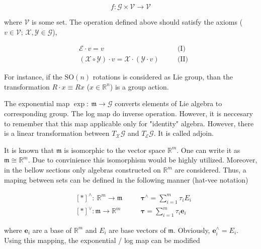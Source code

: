 \begin{equation}
    f: \mathcal{G} \times \mathcal{V} \to \mathcal{V}
\end{equation}

where $\mathcal{V}$ is some set. The operation defined above should satisfy 
the axioms ($v \in \mathcal{V}$; $\mathcal{X}, \mathcal{Y} \in \mathcal{G}$),

\begin{equation}
    \begin{aligned}
        \label{eqn:act_axi}
        & \mathcal{E} \cdot v = v \quad && \text{(I)} \\
        & (\mathcal{X} \circ \mathcal{Y}) \cdot v = 
        \mathcal{X} \cdot (\mathcal{Y} \cdot v) \quad && \text{(II)}
    \end{aligned}
\end{equation}

For instance, if the $\text{SO}(n)$ rotations is considered as Lie group, than the 
transformation $R \cdot x \equiv R x$ ($x \in \mathbb{R}^n$) is a group action.

The exponential map $\exp:\ \mathfrak{m} \to \mathcal{G}$ converts elements of 
Lie algebra to corresponding group. The log map do inverse operation. 
However, it is neccesary to remember that 
this map applicable only for "identity" algebra. However, there is a linear
transformation between $T_{\mathcal{X}} \mathcal{G}$ and $T_{\mathcal{E}} 
\mathcal{G}$. It is called adjoin.

It is known that $\mathfrak{m}$ is isomorphic to the vector space $\mathbb{R}^m$. 
One can write it as $\mathfrak{m} \cong \mathbb{R}^m$. Due to convinience this 
isomorphism would be highly utilized. Moreover, in the bellow sections only 
algebras constructed on $\mathbb{R}^m$ are considered. Thus, a maping between 
sets can be defined in the following manner (hat-vee notation)

\begin{equation}
    \begin{aligned}
        \label{eqn:hat_vee_not}
        & [*]^\wedge: \ \mathbb{R}^m \to \mathfrak{m} \quad &&
        \boldsymbol{\tau}^\wedge = \sum_{i=1}^{m} \tau_i E_i \\
        & [*]^\vee: \mathfrak{m} \to \mathbb{R}^m \quad && 
        \boldsymbol{\tau} = \sum_{i=1}^{m} \tau_i \mathbf{e}_i
    \end{aligned}
\end{equation}

where $\mathbf{e}_i$ are a base of $\mathbb{R}^m$ and $E_i$ are base vectors 
of $\mathfrak{m}$. Obviously, $\mathbf{e}_i^\wedge = E_i$. Using this mapping, the
exponential / log map can be modified 

